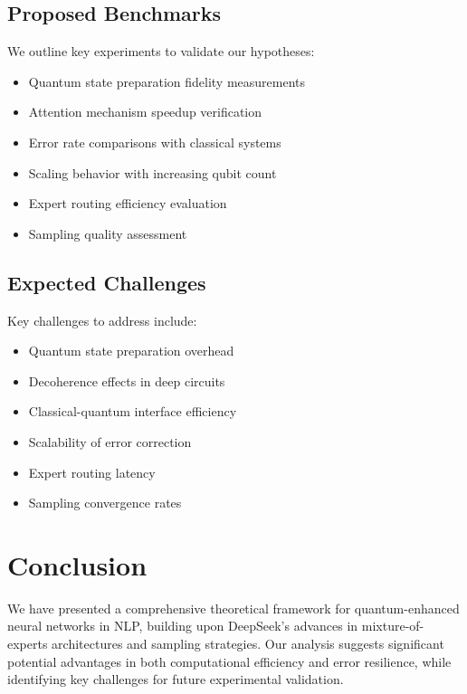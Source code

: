 \documentclass{article}
\begin{document}
\subsection{Proposed Benchmarks}
We outline key experiments to validate our hypotheses:

\begin{itemize}
\item Quantum state preparation fidelity measurements
\item Attention mechanism speedup verification
\item Error rate comparisons with classical systems
\item Scaling behavior with increasing qubit count
\item Expert routing efficiency evaluation
\item Sampling quality assessment
\end{itemize}

\subsection{Expected Challenges}
Key challenges to address include:

\begin{itemize}
\item Quantum state preparation overhead
\item Decoherence effects in deep circuits
\item Classical-quantum interface efficiency
\item Scalability of error correction
\item Expert routing latency
\item Sampling convergence rates
\end{itemize}

\section{Conclusion}
We have presented a comprehensive theoretical framework for quantum-enhanced neural networks in NLP, building upon DeepSeek's advances in mixture-of-experts architectures and sampling strategies. Our analysis suggests significant potential advantages in both computational efficiency and error resilience, while identifying key challenges for future experimental validation.
\end{document}
